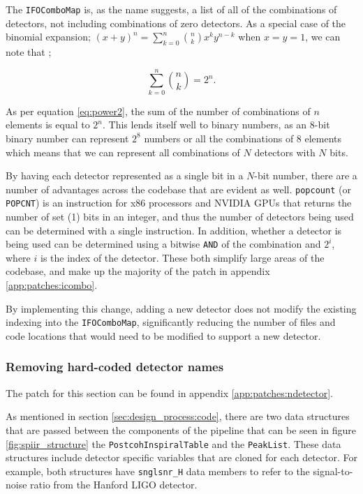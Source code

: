 \documentclass{article}
\begin{document}
The \texttt{IFOComboMap} is, as the name suggests, a list of all of the combinations of detectors, not including combinations of zero detectors.
As a special case of the binomial expansion;
\( (x + y)^n = \sum^n_{k=0}\binom{n}{k}x^ky^{n-k} \) when \(x = y = 1\), we can note that \cite{CLRS_combinations};

\begin{equation}
    \label{eq:power2}
    \sum^n_{k=0}\binom{n}{k} = 2^n.
\end{equation}

As per equation \ref{eq:power2}, the sum of the number of combinations of \(n\) elements is equal to \(2^n\).
This lends itself well to binary numbers, as an 8-bit binary number can represent \(2^8\) numbers or all the combinations of 8 elements \textemdash{} which means that we can represent all combinations of \(N\) detectors with \(N\) bits.

By having each detector represented as a single bit in a \(N\)-bit number, there are a number of advantages across the codebase that are evident as well.
\texttt{popcount} (or \texttt{POPCNT}) is an instruction for x86 processors and NVIDIA GPUs that returns the number of set (1) bits in an integer, and thus the number of detectors being used can be determined with a single instruction.
In addition, whether a detector is being used can be determined using a bitwise \texttt{AND} of the combination and \(2^{i}\), where \(i\) is the index of the detector.
These both simplify large areas of the codebase, and make up the majority of the patch in appendix \ref{app:patches:icombo}.

By implementing this change, adding a new detector does not modify the existing indexing into the \texttt{IFOComboMap}, significantly reducing the number of files and code locations that would need to be modified to support a new detector.

\subsubsection{Removing hard-coded detector names} \label{sec:final_design:patches:ndetector}

The patch for this section can be found in appendix \ref{app:patches:ndetector}.

As mentioned in section \ref{sec:design_process:code}, there are two data structures that are passed between the components of the pipeline that can be seen in figure \ref{fig:spiir_structure} \textemdash{} the \texttt{PostcohInspiralTable} and the \texttt{PeakList}.
These data structures include detector specific variables that are cloned for each detector.
For example, both structures have \texttt{snglsnr\_H} data members to refer to the signal-to-noise ratio from the Hanford LIGO detector.
\end{document}
